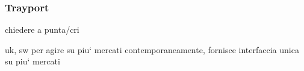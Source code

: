 
\subsubsection{Trayport}
    chiedere a punta/cri
    
    uk, sw per agire su piu` mercati contemporaneamente, fornisce interfaccia unica su piu` mercati